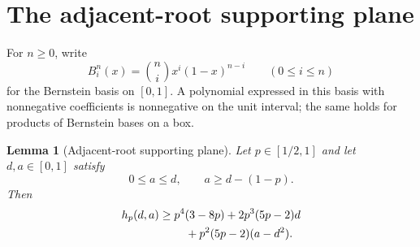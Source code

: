 \documentclass[11pt]{article}
\newtheorem{lemma}[theorem]{Lemma}
\begin{document}
\section{The adjacent-root supporting plane}

For $n\geq0$, write
\[
 B_i^n(x)=\binom ni x^i(1-x)^{n-i}
 \qquad(0\leq i\leq n)
\]
for the Bernstein basis on $[0,1]$.  A polynomial expressed in this basis
with nonnegative coefficients is nonnegative on the unit interval; the same
holds for products of Bernstein bases on a box.

\begin{lemma}[Adjacent-root supporting plane]\label{lem:scalar}
Let $p\in[1/2,1]$ and let $d,a\in[0,1]$ satisfy
\[
 0\leq a\leq d,
 \qquad a\geq d-(1-p).
\]
Then
\begin{align}
 h_p(d,a)\geq{}&p^4(3-8p)+2p^3(5p-2)d
 \notag\\
 &\quad+p^2(5p-2)(a-d^2).
 \label{eq:scalar}
\end{align}
\end{lemma}
\end{document}
